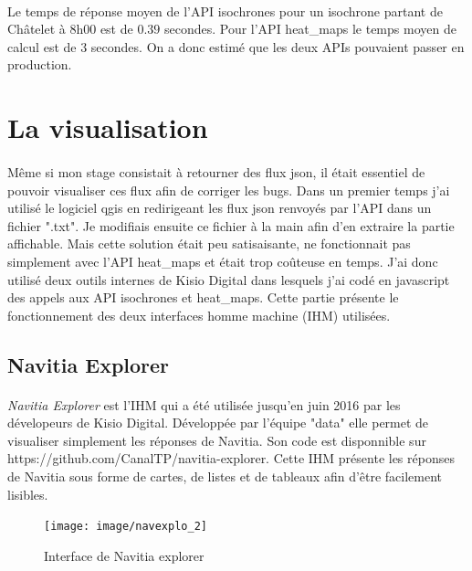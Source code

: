 \documentclass[a4paper]{report}
\begin{document}
\paragraph{} Le temps de réponse moyen de l'API isochrones pour un isochrone partant de Châtelet à 8h00 est de $0.39$ secondes.  Pour l'API heat\_maps le temps moyen de calcul est de $3$ secondes. On a donc estimé que les deux APIs pouvaient passer en production.

\section{La visualisation}

\paragraph{} Même si mon stage consistait à retourner des flux json, il était essentiel de pouvoir visualiser ces flux afin de corriger les bugs. Dans un premier temps j'ai utilisé le logiciel qgis en redirigeant les flux json renvoyés par l'API dans un fichier ".txt". Je modifiais ensuite ce fichier à la main afin d'en extraire la partie affichable. Mais cette solution était peu satisaisante, ne fonctionnait pas simplement avec l'API heat\_maps et était trop coûteuse en temps. J'ai donc utilisé deux outils internes de Kisio Digital dans lesquels j'ai codé en javascript des appels aux API isochrones et heat\_maps. Cette partie présente le fonctionnement des deux interfaces homme machine (IHM) utilisées.

\subsection{Navitia Explorer}

\paragraph{} \emph{Navitia Explorer} est l'IHM qui a été utilisée jusqu'en juin 2016 par les dévelopeurs de Kisio Digital. Développée par l'équipe "data" elle permet de visualiser simplement les réponses de Navitia. Son code est disponnible sur \color{blue} https://github.com/CanalTP/navitia-explorer\color{black}. Cette IHM présente les réponses de Navitia sous forme de cartes, de listes et de tableaux afin d'être facilement lisibles.

\begin{figure}[H]
	\begin{center}
		\texttt{[image: image/navexplo\_2]}
		\caption{Interface de Navitia explorer}
		\label{Interface de Navitia explorer}
	\end{center}
\end{figure}
\end{document}
